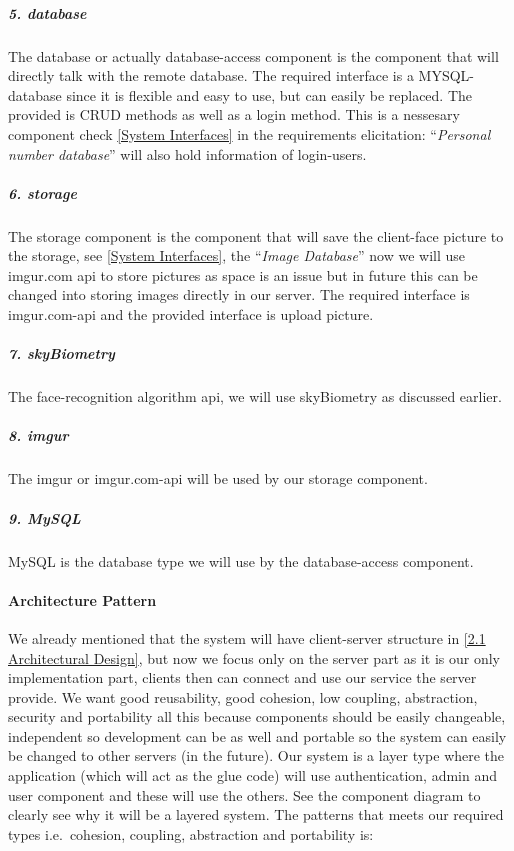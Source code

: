\documentclass[a4paper,11pt]{article}
\begin{document}
\subparagraph{5. database}\label{database}

The database or actually database-access component is the component that
will directly talk with the remote database. The required interface is a
MYSQL-database since it is flexible and easy to use, but can easily be replaced. The provided is CRUD methods as well as a login method. This is a nessesary component check \ref{System Interfaces} in the requirements elicitation: ``\emph{Personal number database}'' will also hold information of login-users.

\subparagraph{6. storage}\label{storage}

The storage component is the component that will save the client-face
picture to the storage, see \ref{System Interfaces}, the ``\emph{Image Database}'' now we will use imgur.com api to store pictures
as space is an issue but in future this can be changed into storing
images directly in our server. The required interface is imgur.com-api
and the provided interface is upload picture.

\subparagraph{7. skyBiometry}\label{skybiometry}

The face-recognition algorithm api, we will use skyBiometry as discussed
earlier.

\subparagraph{8. imgur}\label{imgur}

The imgur or imgur.com-api will be used by our storage component.

\subparagraph{9. MySQL}\label{mysql}

MySQL is the database type we will use by the database-access component.

\paragraph{Architecture Pattern}\label{architecture-pattern}

We already mentioned that the system will have client-server structure in \ref{2.1 Architectural Design}, but now we focus only on the server part as it is our only implementation part, clients then can connect and use our service the server provide.
We want good reusability, good cohesion, low coupling, abstraction, security and
portability all this because components should be easily changeable,
independent so development can be as well and portable so the system can
easily be changed to other servers (in the future). Our system is a
layer type where the application (which will act as the glue code) will
use authentication, admin and user component and these will use the
others. See the component diagram to clearly see why it will be a
layered system. The patterns that meets our required types
i.e.~cohesion, coupling, abstraction and portability is:
\end{document}
